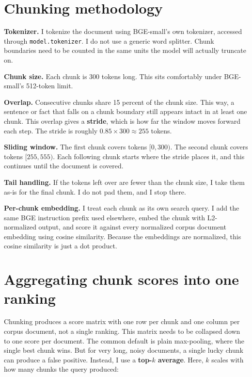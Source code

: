 \documentclass[11pt]{article}
\begin{document}
\section{Chunking methodology}

\textbf{Tokenizer.} I tokenize the document using BGE-small's own tokenizer, accessed
through \texttt{model.tokenizer}. I do not use a generic word splitter. Chunk
boundaries need to be counted in the same units the model will actually truncate on.

\textbf{Chunk size.} Each chunk is 300 tokens long. This sits comfortably under
BGE-small's 512-token limit.

\textbf{Overlap.} Consecutive chunks share 15 percent of the chunk size. This way, a
sentence or fact that falls on a chunk boundary still appears intact in at least one
chunk. This overlap gives a \textbf{stride}, which is how far the window moves
forward each step. The stride is roughly $0.85 \times 300 \approx 255$ tokens.

\textbf{Sliding window.} The first chunk covers tokens $[0, 300)$. The second chunk
covers tokens $[255, 555)$. Each following chunk starts where the stride places it,
and this continues until the document is covered.

\textbf{Tail handling.} If the tokens left over are fewer than the chunk size, I
take them as-is for the final chunk. I do not pad them, and I stop there.

\textbf{Per-chunk embedding.} I treat each chunk as its own search query. I add the
same BGE instruction prefix used elsewhere, embed the chunk with L2-normalized
output, and score it against every normalized corpus document embedding using
cosine similarity. Because the embeddings are normalized, this cosine similarity is
just a dot product.

\section{Aggregating chunk scores into one ranking}

Chunking produces a score matrix with one row per chunk and one column per corpus
document, not a single ranking. This matrix needs to be collapsed down to one score
per document. The common default is plain max-pooling, where the single best chunk
wins. But for very long, noisy documents, a single lucky chunk can produce a false
positive. Instead, I use a \textbf{top-$k$ average}. Here, $k$ scales with how many
chunks the query produced:
\end{document}
